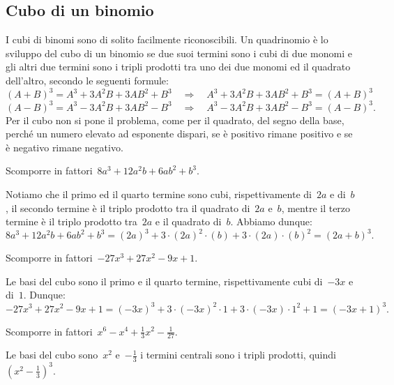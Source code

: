 \subsection{Cubo di un binomio}
I cubi di binomi sono di solito facilmente riconoscibili. Un quadrinomio è lo sviluppo del cubo di un binomio se due suoi termini sono i cubi
di due monomi e gli altri due termini sono i tripli prodotti tra uno dei due monomi ed il quadrato dell’altro, secondo le seguenti formule: %
\begin{equation*}
(A+B)^{3}=A^{3}+3A^{2}B+3AB^{2}+B^{3}\quad \Rightarrow \quad A^{3}+3A^{2}B+3AB^{2}+B^{3}=(A+B)^{3}\phantom{.}
\end{equation*}
\begin{equation*}
(A-B)^{3}=A^{3}-3A^{2}B+3AB^{2}-B^{3}\quad \Rightarrow \quad A^{3}-3A^{2}B+3AB^{2}-B^{3}=(A-B)^{3}.
\end{equation*}
Per il cubo non si pone il problema, come per il quadrato, del segno della base, perché un numero elevato ad esponente dispari,
se è positivo rimane positivo e se è negativo rimane negativo.

\begin{exrig}
 \begin{esempio}
Scomporre in fattori~$8a^{3}+12a^{2}b+6{ab}^{2}+b^{3}$.

Notiamo che il primo ed il quarto termine sono cubi, rispettivamente di~$2a$ e di~$b$, il secondo termine è il triplo
prodotto tra il quadrato di~$2a$ e~$b$, mentre il terzo termine è il triplo prodotto tra~$2a$ e il quadrato di~$b$.
Abbiamo dunque:
\[8a^{3}+12a^{2}b+6ab^{2}+b^{3}=(2a)^{3}+3\cdot (2a)^{2}\cdot (b)+3\cdot (2a)\cdot (b)^{2}=(2a+b)^{3}.\]
 \end{esempio}

 \begin{esempio}
Scomporre in fattori~$-27x^{3}+27x^{2}-9x+1$.

Le basi del cubo sono il primo e il quarto termine, rispettivamente cubi di~$-3x$ e di~$1$.
Dunque:
\[-27x^{3}+27x^{2}-9x+1=(-3x)^{3}+3\cdot (-3x)^{2}\cdot 1+3\cdot (-3x)\cdot 1^{2}+1=(-3x+1)^{3}.\]
 \end{esempio}

 \begin{esempio}
Scomporre in fattori~$x^{6}-x^{4}+\frac{1}{3}x^{2}-\frac{1}{27}$.

Le basi del cubo sono~$x^{2}$ e~$-\frac{1}{3}$ i termini centrali sono i tripli prodotti,
quindi~$\left(x^{2}-\frac{1}{3}\right)^{3}$.
\end{esempio}
\end{exrig}
\ovalbox{\risolvii \ref{ese:13.51}, \ref{ese:13.52}, \ref{ese:13.53}, \ref{ese:13.54}, \ref{ese:13.55}, \ref{ese:13.56}, \ref{ese:13.57}, \ref{ese:13.58},\ref{ese:13.59}}

